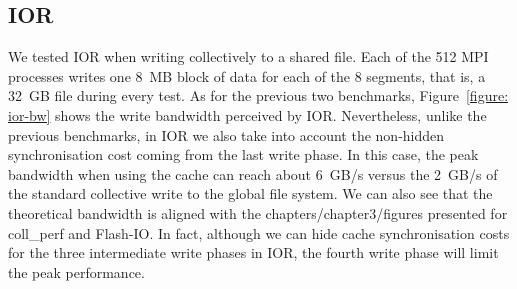 \subsection{IOR}
\label{subsec: ior}
We tested IOR when writing collectively to a shared file. Each of the 512 MPI processes writes one 8~MB block of data for each of the 8 segments, that is, a 32~GB file during every test.
As for the previous two benchmarks, Figure~\ref{figure: ior-bw} shows the write bandwidth perceived by IOR. Nevertheless, unlike the previous benchmarks, in IOR we also take into account the non-hidden synchronisation cost coming from the last write phase. In this case, the peak bandwidth when using the cache can reach about 6~GB/s versus the 2~GB/s of the standard collective write to the global file system. We can also see that the theoretical bandwidth is aligned with the chapters/chapter3/figures presented for coll\_perf and Flash-IO. In fact, although we can hide cache synchronisation costs for the three intermediate write phases in IOR, the fourth write phase will limit the peak performance.

